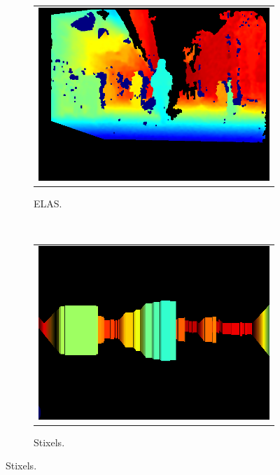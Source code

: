 \begin{figure}[h!]
        \centering
        \begin{subfigure}[b]{0.25\textwidth}
	  \begin{tabular}{c}
	    \includegraphics[width=\textwidth]{elas}
	  \end{tabular}
	  \caption{ELAS.}\label{fig:cp04_reconstruction_elas}
        \end{subfigure}%
        ~
        \begin{subfigure}[b]{0.25\textwidth}
	  \begin{tabular}{c}
	    \includegraphics[width=\textwidth]{stixels}
	  \end{tabular}
	  \caption{Stixels.}\label{fig:cp04_reconstruction_stixels}

\end{subfigure}
\end{figure}
